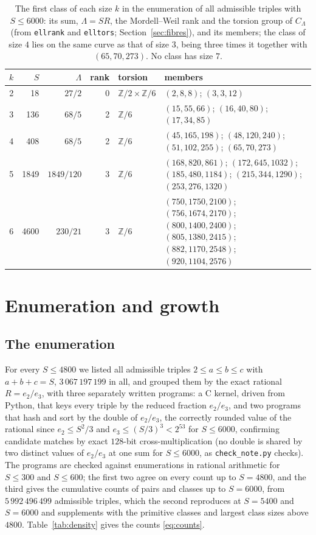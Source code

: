 \documentclass[11pt]{amsart}
\theoremstyle{definition}
\theoremstyle{remark}
\newcommand{\Z}{\mathbb{Z}}
\begin{document}
\begin{table}[t]
\caption{The first class of each size $k$ in the enumeration of all admissible triples with $S\le6000$: its sum, $\Lambda=SR$, the Mordell--Weil rank and the torsion group of $C_\Lambda$ (from \texttt{ellrank} and \texttt{elltors}; Section~\ref{sec:fibres}), and its members; the class of size $4$ lies on the same curve as that of size $3$, being three times it together with $(65,70,273)$. No class has size $7$.}\label{tab:fibres}
\centering\small
\begin{tabular}{@{}rrrrl>{\raggedright\arraybackslash}p{}@{}}
\toprule
$k$ & $S$ & $\Lambda$ & rank & torsion & members\\
\midrule
2 & 18 & $27/2$ & 0 & $\Z/2\times\Z/6$ & $(2,8,8)$; $(3,3,12)$ \\
3 & 136 & $68/5$ & 2 & $\Z/6$ & $(15,55,66)$; $(16,40,80)$; $(17,34,85)$ \\
4 & 408 & $68/5$ & 2 & $\Z/6$ & $(45,165,198)$; $(48,120,240)$; $(51,102,255)$; $(65,70,273)$ \\
5 & 1849 & $1849/120$ & 3 & $\Z/6$ & $(168,820,861)$; $(172,645,1032)$; $(185,480,1184)$; $(215,344,1290)$; $(253,276,1320)$ \\
6 & 4600 & $230/21$ & 3 & $\Z/6$ & $(750,1750,2100)$; $(756,1674,2170)$; $(800,1400,2400)$; $(805,1380,2415)$; $(882,1170,2548)$; $(920,1104,2576)$ \\
\bottomrule
\end{tabular}
\end{table}

\section{Enumeration and growth}\label{sec:growth}

\subsection{The enumeration}
For every $S\le4800$ we listed all admissible triples $2\le a\le b\le c$ with $a+b+c=S$, $3\,067\,197\,199$ in all, and grouped them by the exact rational $R=e_2/e_3$, with three separately written programs: a C kernel, driven from Python, that keys every triple by the reduced fraction $e_2/e_3$, and two programs that hash and sort by the double of $e_2/e_3$, the correctly rounded value of the rational since $e_2\le S^2/3$ and $e_3\le(S/3)^3<2^{53}$ for $S\le6000$, confirming candidate matches by exact $128$-bit cross-multiplication (no double is shared by two distinct values of $e_2/e_3$ at one sum for $S\le6000$, as \texttt{check\_note.py} checks). The programs are checked against enumerations in rational arithmetic for $S\le300$ and $S\le600$; the first two agree on every count up to $S=4800$, and the third gives the cumulative counts of pairs and classes up to $S=6000$, from $5\,992\,496\,499$ admissible triples, which the second reproduces at $S=5400$ and $S=6000$ and supplements with the primitive classes and largest class sizes above $4800$. Table~\ref{tab:density} gives the counts \eqref{eq:counts}.
\end{document}

